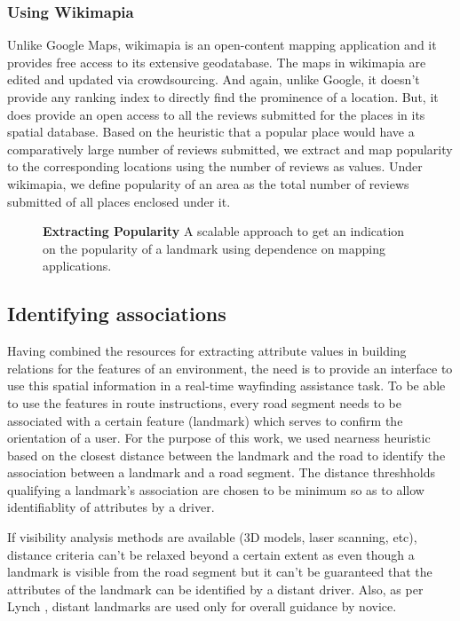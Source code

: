 \documentclass{iitkthesis}
\begin{document}
\subsubsection*{Using Wikimapia}
Unlike Google Maps, wikimapia is an open-content mapping application and it provides free access to its extensive geodatabase. The maps in wikimapia are edited and updated via crowdsourcing. And again, unlike Google, it doesn't provide any ranking index to directly find the prominence of a location. But, it does provide an open access to all the reviews submitted for the places in its spatial database. Based on the heuristic that a popular place would have a comparatively large number of reviews submitted, we extract and map popularity to the corresponding locations using the number of reviews as values. Under wikimapia, we define popularity of an area as the total number of reviews submitted of all places enclosed under it.
\begin{figure}
\centering
{}
\caption{\textbf{\textbf{Extracting Popularity}} A scalable approach to get an indication on the popularity of a landmark using dependence on mapping applications.}
\label{fig:popular}
 \end{figure}

\subsection{Identifying associations}
Having combined the resources for extracting attribute values in building relations for the features of an environment, the need is to provide an interface to use this spatial information in a real-time wayfinding assistance task. To be able to use the features in route instructions, every road segment needs to be associated with a certain feature (landmark) which serves to confirm the orientation of a user. For the purpose of this work, we used nearness heuristic based on the closest distance between the landmark and the road to identify the association between a landmark and a road segment. The distance threshholds qualifying a landmark's association are chosen to be minimum so as to allow identifiablity of attributes by a driver. 

If visibility analysis methods are available (3D models, laser scanning, etc), distance criteria can't be relaxed beyond a certain extent as even though a landmark is visible from the road segment but it can't be guaranteed that the attributes of the landmark can be identified by a distant driver. Also, as per Lynch \cite{lynch}, distant landmarks are used only for overall guidance by novice.
\end{document}
